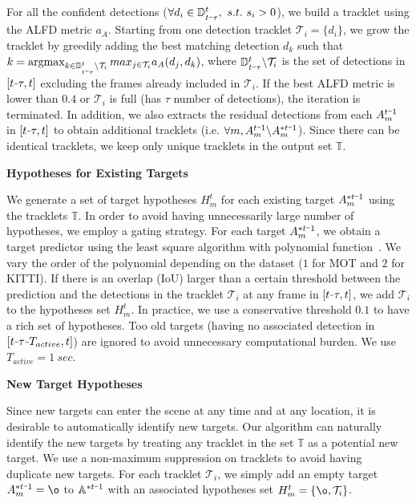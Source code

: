 \documentclass[10pt,twocolumn,letterpaper]{article}
\newcommand{\argmax}{\operatornamewithlimits{argmax}}
\newcommand{\nosection}[1]{\vspace{2mm}\noindent\textbf{#1}}
\newcommand{\minus}{\scalebox{0.5}[1.0]{$-$}}
\begin{document}
For all the confident detections ($\forall d_i \in \mathbb{D}_{t \minus \tau}^t,\ s.t.\ s_i > 0$), we build a tracklet using the ALFD metric $a_{A}$. Starting from one detection tracklet $\mathcal{T}_i = \{d_i\}$, we grow the tracklet by greedily adding the best matching detection $d_k$ such that $k = \argmax_{k \in \mathbb{D}_{t \minus \tau}^t \backslash \mathcal{T}_i} max_{j \in \mathcal{T}_i} a_{A}(d_j, d_k)$, where $\mathbb{D}_{t \minus \tau}^t \backslash \mathcal{T}_i$ is the set of detections in $[t\minus\tau, t]$ excluding the frames already included in $\mathcal{T}_i$. If the best ALFD metric is lower than $0.4$ or $\mathcal{T}_i$ is full (has $\tau$ number of detections), the iteration is terminated. In addition, we also extracts the residual detections from each $A_m^{t \minus 1}$ in $[t \minus \tau, t]$ to obtain additional tracklets (i.e. $\forall m, A_m^{t \minus 1} \backslash A_m^{*t \minus 1}$). Since there can be identical tracklets, we keep only unique tracklets in the output set $\mathbb{T}$.

\nosection{Hypotheses for Existing Targets}
\vspace{0.25em}

We generate a set of target hypotheses $H_m^t$ for each existing target $A_m^{* t\minus 1}$ using the tracklets $\mathbb{T}$. In order to avoid having unnecessarily large number of hypotheses, we employ a gating strategy. For each target $A_m^{* t\minus 1}$, we obtain a target predictor using the least square algorithm with polynomial function~\cite{leon1980linear}. We vary the order of the polynomial depending on the dataset ($1$ for MOT and $2$ for KITTI). If there is an overlap (IoU) larger than a certain threshold between the prediction and the detections in the tracklet $\mathcal{T}_i$ at any frame in $[t \minus \tau, t]$, we add $\mathcal{T}_i$ to the hypotheses set $H_m^t$. In practice, we use a conservative threshold $0.1$ to have a rich set of hypotheses. Too old targets (having no associated detection in $[t \minus \tau \minus T_{active}, t]$) are ignored to avoid unnecessary computational burden. We use $T_{active} = 1\ sec$. 

\nosection{New Target Hypotheses}
\vspace{0.25em}

Since new targets can enter the scene at any time and at any location, it is desirable to automatically identify new targets. Our algorithm can naturally identify the new targets by treating any tracklet in the set $\mathbb{T}$ as a potential new target. We use a non-maximum suppression on tracklets to avoid having duplicate new targets. For each tracklet $\mathcal{T}_i$, we simply add an empty target $A_m^{* t\minus 1} = \o$ to $\mathbb{A}^{* t\minus 1}$ with an associated hypotheses set $H_m^t = \{\o, \mathcal{T}_i\}$.
\end{document}
